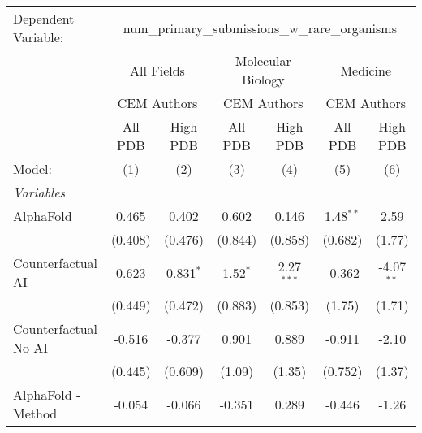 \begingroup
\centering
\begin{tabular}{lcccccc}
   \tabularnewline \midrule \midrule
   Dependent Variable: & \multicolumn{6}{c}{num\_primary\_submissions\_w\_rare\_organisms}\\
 & \multicolumn{2}{c}{All Fields} & \multicolumn{2}{c}{Molecular Biology} & \multicolumn{2}{c}{Medicine} \\
\cmidrule(lr){2-3} \cmidrule(lr){4-5} \cmidrule(lr){6-7}
 & \multicolumn{2}{c}{CEM Authors} & \multicolumn{2}{c}{CEM Authors} & \multicolumn{2}{c}{CEM Authors} \\
\cmidrule(lr){2-3} \cmidrule(lr){4-5} \cmidrule(lr){6-7}
 & \multicolumn{1}{c}{All PDB} & \multicolumn{1}{c}{High PDB} & \multicolumn{1}{c}{All PDB} & \multicolumn{1}{c}{High PDB} & \multicolumn{1}{c}{All PDB} & \multicolumn{1}{c}{High PDB} \\
\cmidrule(lr){2-2} \cmidrule(lr){3-3} \cmidrule(lr){4-4} \cmidrule(lr){5-5} \cmidrule(lr){6-6} \cmidrule(lr){7-7}
   Model:                                                     & (1)          & (2)           & (3)          & (4)           & (5)         & (6)\\  
   \midrule
   \emph{Variables}\\
   AlphaFold                                                  & 0.465        & 0.402         & 0.602        & 0.146         & 1.48$^{**}$ & 2.59\\   
                                                              & (0.408)      & (0.476)       & (0.844)      & (0.858)       & (0.682)     & (1.77)\\   
   Counterfactual AI                                          & 0.623        & 0.831$^{*}$   & 1.52$^{*}$   & 2.27$^{***}$  & -0.362      & -4.07$^{**}$\\   
                                                              & (0.449)      & (0.472)       & (0.883)      & (0.853)       & (1.75)      & (1.71)\\   
   Counterfactual No AI                                       & -0.516       & -0.377        & 0.901        & 0.889         & -0.911      & -2.10\\   
                                                              & (0.445)      & (0.609)       & (1.09)       & (1.35)        & (0.752)     & (1.37)\\   
   AlphaFold - Method                                         & -0.054       & -0.066        & -0.351       & 0.289         & -0.446      & -1.26\\   

\end{tabular}
